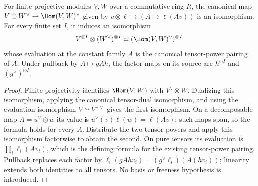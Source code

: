 \begin{lemma}
\label{lem:hom-dual-tensor-regrouping}
\leanok
For finite projective modules $V,W$ over a commutative ring $R$, the
canonical map $V\otimes W^\vee\to\Hom(V,W)^\vee$ given by
$v\otimes\ell\mapsto(A\mapsto\ell(Av))$ is an isomorphism.
For every finite set $I$, it induces an isomorphism
\[
 V^{\otimes I}\otimes(W^\vee)^{\otimes I}
 \simeq (\Hom(V,W)^\vee)^{\otimes I}
\]
whose evaluation at the constant family $A$ is the canonical tensor-power
pairing of $A$. Under pullback by $A\mapsto gAh$, the factor maps on
its source are $h^{\otimes I}$ and $(g^\vee)^{\otimes I}$.
\end{lemma}
\begin{proof}
Finite projectivity identifies $\Hom(V,W)$ with $V^\vee\otimes W$.
Dualizing this isomorphism, applying the canonical tensor-dual
isomorphism, and using the evaluation isomorphism $V\simeq V^{\vee\vee}$
gives the first isomorphism. On a decomposable map $A=u^\vee\otimes w$
its value is $u^\vee(v)\ell(w)=\ell(Av)$; such maps span, so the
formula holds for every $A$. Distribute the two tensor powers and apply
this isomorphism factorwise to obtain the second. On pure tensors its
evaluation is $\prod_i\ell_i(Av_i)$, which is the defining formula for
the existing tensor-power pairing. Pullback replaces each factor by
$\ell_i(gAhv_i)=(g^\vee\ell_i)(A(hv_i))$; linearity extends both
identities to all tensors. No basis or freeness hypothesis is introduced.
\end{proof}

